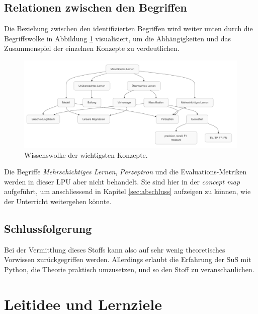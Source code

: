 \documentclass[twocolumn]{article}
\begin{document}
\subsection{Relationen zwischen den Begriffen}

Die Beziehung zwischen den identifizierten Begriffen wird weiter unten durch die Begriffswolke in Abbildung \ref{fig:conceptmap} visualisiert, um die Abhängigkeiten und das Zusammenspiel der einzelnen Konzepte zu verdeutlichen.


\begin{figure}[t]
    \centering
    \includegraphics[width=\textwidth]{mindmap}
    \caption{Wissenswolke der wichtigsten Konzepte. }
    \label{fig:conceptmap}
\end{figure}

Die Begriffe \textit{Mehrschichtiges Lernen}, \textit{Perzeptron} und die Evaluations-Metriken werden in dieser LPU aber nicht behandelt. Sie sind hier in der \textit{concept map} aufgeführt, um anschliessend in Kapitel \ref{sec:abschluss} aufzeigen zu können, wie der Unterricht weitergehen könnte.

\subsection{Schlussfolgerung}

Bei der Vermittlung dieses Stoffs kann also auf sehr wenig theoretisches Vorwissen zurückgegriffen werden. Allerdings erlaubt die Erfahrung der SuS mit Python, die Theorie praktisch umzusetzen, und so den Stoff zu veranschaulichen.



\section{Leitidee und Lernziele}
\label{sec:leitidee}
\end{document}
